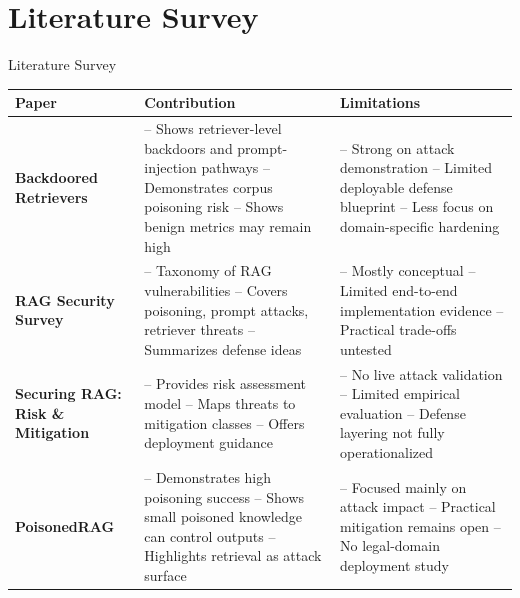 \documentclass[aspectratio=169]{beamer}
\begin{document}
\section{Literature Survey}
\begin{frame}{Literature Survey}
    \tiny
    \setlength{\tabcolsep}{4pt}
    \begin{tabularx}{\textwidth}{|p{}|X|X|}
        \hline
        \textbf{Paper} & \textbf{Contribution} & \textbf{Limitations} \\ \hline

        \textbf{Backdoored Retrievers} &
        -- Shows retriever-level backdoors and prompt-injection pathways \newline
        -- Demonstrates corpus poisoning risk \newline
        -- Shows benign metrics may remain high &
        -- Strong on attack demonstration \newline
        -- Limited deployable defense blueprint \newline
        -- Less focus on domain-specific hardening \\ \hline

        \textbf{RAG Security Survey} &
        -- Taxonomy of RAG vulnerabilities \newline
        -- Covers poisoning, prompt attacks, retriever threats \newline
        -- Summarizes defense ideas &
        -- Mostly conceptual \newline
        -- Limited end-to-end implementation evidence \newline
        -- Practical trade-offs untested \\ \hline

        \textbf{Securing RAG: Risk \& Mitigation} &
        -- Provides risk assessment model \newline
        -- Maps threats to mitigation classes \newline
        -- Offers deployment guidance &
        -- No live attack validation \newline
        -- Limited empirical evaluation \newline
        -- Defense layering not fully operationalized \\ \hline

        \textbf{PoisonedRAG} &
        -- Demonstrates high poisoning success \newline
        -- Shows small poisoned knowledge can control outputs \newline
        -- Highlights retrieval as attack surface &
        -- Focused mainly on attack impact \newline
        -- Practical mitigation remains open \newline
        -- No legal-domain deployment study \\ \hline
    \end{tabularx}
\end{frame}
\end{document}
